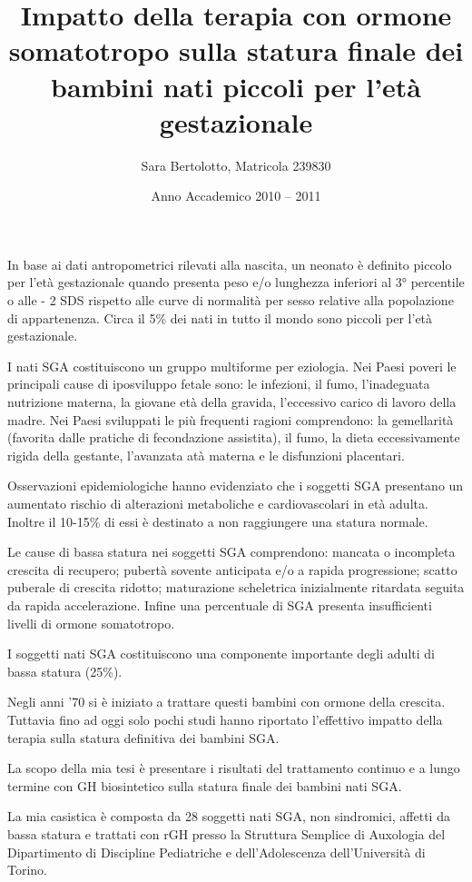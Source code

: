 \documentclass[12pt,a4paper]{article}
\author{Sara Bertolotto, Matricola 239830}
\title{Impatto della terapia con ormone somatotropo sulla statura finale dei bambini nati piccoli per l'età gestazionale}
\date{Anno Accademico 2010 -- 2011}
\begin{document}
\maketitle
In base ai dati antropometrici rilevati alla nascita, un neonato è definito piccolo per l'età gestazionale quando presenta peso e/o lunghezza inferiori al 3° percentile o alle - 2 SDS rispetto alle curve di normalità per sesso relative alla popolazione di appartenenza. Circa il 5\% dei nati in tutto il mondo sono piccoli per l'età gestazionale. 

I nati SGA costituiscono un gruppo multiforme per eziologia. Nei Paesi poveri le principali cause di iposviluppo fetale sono: le infezioni, il fumo, l'inadeguata nutrizione materna, la giovane età della gravida, l'eccessivo carico di lavoro della madre. Nei Paesi sviluppati le più frequenti ragioni comprendono: la gemellarità (favorita dalle pratiche di fecondazione assistita), il fumo, la dieta eccessivamente rigida della gestante, l'avanzata atà materna e le disfunzioni placentari.

Osservazioni epidemiologiche hanno evidenziato che i soggetti SGA presentano un aumentato rischio di alterazioni metaboliche e cardiovascolari in età adulta. Inoltre il 10-15\% di essi è destinato a non raggiungere una statura normale.

Le cause di bassa statura nei soggetti SGA comprendono: mancata o incompleta crescita di recupero; pubertà sovente anticipata e/o a rapida progressione; scatto puberale di crescita ridotto; maturazione scheletrica inizialmente ritardata seguita da rapida accelerazione. Infine una percentuale di SGA presenta insufficienti livelli di ormone somatotropo.

I soggetti nati SGA costituiscono una componente importante degli adulti di bassa statura (25\%).

Negli anni '70 si è iniziato a trattare questi bambini con ormone della crescita. Tuttavia fino ad oggi solo pochi studi hanno riportato l'effettivo impatto della terapia sulla statura definitiva dei bambini SGA.

La scopo della mia tesi è presentare i risultati del trattamento continuo e a lungo termine con GH  biosintetico sulla statura finale dei bambini nati SGA.

La mia casistica è composta da 28 soggetti nati SGA, non sindromici, affetti da bassa statura e trattati con rGH presso la Struttura Semplice di Auxologia del Dipartimento di Discipline Pediatriche e dell'Adolescenza dell'Università di Torino.
\end{document}
